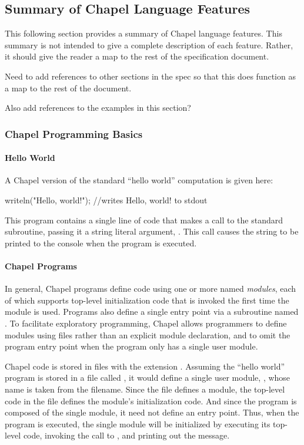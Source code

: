 \subsection{Summary of Chapel Language Features}

This following section provides a summary of Chapel language features.  
This summary is not intended to give a complete description of each feature.
Rather, it should give the reader a map to the rest of the specification
document.  

\begin{TODO}
Need to add references to other sections in the spec so that this does
function as a map to the rest of the document.

Also add references to the examples in this section?
\end{TODO}

\subsubsection{Chapel Programming Basics}
\paragraph{Hello World} 
A Chapel version of the standard ``hello world'' computation is given
here:
\begin{chapel}
writeln("Hello, world!"); //writes Hello, world! to stdout
\end{chapel}
\noindent This program contains a single line of code that makes a
call to the standard  subroutine, passing it a string
literal argument, .  This call causes the string
to be printed to the console when the program is executed.

\paragraph{Chapel Programs}
In general, Chapel programs define code using one or more named
\emph{modules}, each of which supports top-level initialization code
that is invoked the first time the module is used.  Programs also
define a single entry point via a subroutine named .  To
facilitate exploratory programming, Chapel allows programmers to
define modules using files rather than an explicit module declaration,
and to omit the program entry point when the program only has a single
user module.  

Chapel code is stored in files with the extension .
Assuming the ``hello world'' program is stored in a file called 
, it
would define a single user module, , whose name is taken
from the filename.  Since the file defines a module, the top-level
code in the file defines the module's initialization code.  And since
the program is composed of the single  module, it need not
define an entry point.  Thus, when the program is executed, the single
 module will be initialized by executing its top-level
code, invoking the call to , and printing out the
message.

